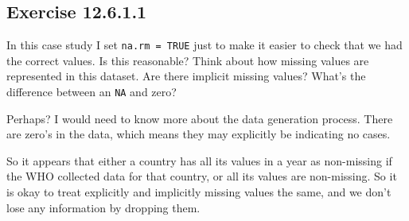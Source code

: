 \documentclass[]{book}
\newenvironment{Shaded}{\begin{snugshade}}{\end{snugshade}}
\newcommand{\CommentTok}[1]{\textcolor[rgb]{0.56,0.35,0.01}{\textit{#1}}}
\newcommand{\DataTypeTok}[1]{\textcolor[rgb]{0.13,0.29,0.53}{#1}}
\newcommand{\DecValTok}[1]{\textcolor[rgb]{0.00,0.00,0.81}{#1}}
\newcommand{\KeywordTok}[1]{\textcolor[rgb]{0.13,0.29,0.53}{\textbf{#1}}}
\newcommand{\NormalTok}[1]{#1}
\newcommand{\OperatorTok}[1]{\textcolor[rgb]{0.81,0.36,0.00}{\textbf{#1}}}
\newcommand{\StringTok}[1]{\textcolor[rgb]{0.31,0.60,0.02}{#1}}
\theoremstyle{plain}
\theoremstyle{remark}
\begin{document}
\hypertarget{exercise-12.6.1.1}{%
\subsection*{\texorpdfstring{Exercise {12.6.1.1}}{Exercise 12.6.1.1}}\label{exercise-12.6.1.1}}

In this case study I set \texttt{na.rm\ =\ TRUE} just to make it easier to check that we had the correct values. Is this reasonable? Think about how missing values are represented in this dataset. Are there implicit missing values? What's the difference between an \texttt{NA} and zero?

Perhaps? I would need to know more about the data generation process.
There are zero's in the data, which means they may explicitly be indicating no cases.

\begin{Shaded}
\end{Shaded}

So it appears that either a country has all its values in a year as non-missing if the WHO collected data for that country, or all its values are non-missing.
So it is okay to treat explicitly and implicitly missing values the same, and we don't lose any information by dropping them.

\begin{Shaded}
\end{Shaded}
\end{document}

